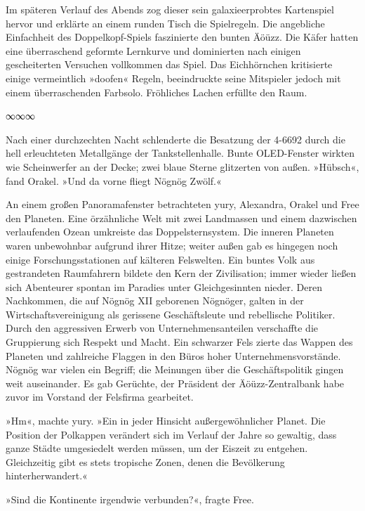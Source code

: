 Im späteren Verlauf des Abends zog dieser sein galaxieerprobtes Kartenspiel hervor und erklärte an einem runden Tisch die Spielregeln. Die angebliche Einfachheit des Doppelkopf-Spiels faszinierte den bunten Äöüzz. Die Käfer hatten eine überraschend geformte Lernkurve und dominierten nach einigen gescheiterten Versuchen vollkommen das Spiel. Das Eichhörnchen kritisierte einige vermeintlich »doofen« Regeln, beeindruckte seine Mitspieler jedoch mit einem überraschenden Farbsolo. Fröhliches Lachen erfüllte den Raum.

\begin{center}
∞∞∞
\end{center}

Nach einer durchzechten Nacht schlenderte die Besatzung der 4-6692 durch die hell erleuchteten Metallgänge der Tankstellenhalle. Bunte OLED-Fenster wirkten wie Scheinwerfer an der Decke; zwei blaue Sterne glitzerten von außen. »Hübsch«, fand Orakel. »Und da vorne fliegt Nögnög Zwölf.«

An einem großen Panoramafenster betrachteten yury, Alexandra, Orakel und Free den Planeten. Eine örzähnliche Welt mit zwei Landmassen und einem dazwischen verlaufenden Ozean umkreiste das Doppelsternsystem. Die inneren Planeten waren unbewohnbar aufgrund ihrer Hitze; weiter außen gab es hingegen noch einige Forschungsstationen auf kälteren Felswelten. Ein buntes Volk aus gestrandeten Raumfahrern bildete den Kern der Zivilisation; immer wieder ließen sich Abenteurer spontan im Paradies unter Gleichgesinnten nieder. Deren Nachkommen, die auf Nögnög XII geborenen Nögnöger, galten in der Wirtschaftsvereinigung als gerissene Geschäftsleute und rebellische Politiker. Durch den aggressiven Erwerb von Unternehmensanteilen verschaffte die Gruppierung sich Respekt und Macht. Ein schwarzer Fels zierte das Wappen des Planeten und zahlreiche Flaggen in den Büros hoher Unternehmensvorstände. Nögnög war vielen ein Begriff; die Meinungen über die Geschäftspolitik gingen weit auseinander. Es gab Gerüchte, der Präsident der Äöüzz-Zentralbank habe zuvor im Vorstand der Felsfirma gearbeitet.

»Hm«, machte yury. »Ein in jeder Hinsicht außergewöhnlicher Planet. Die Position der Polkappen verändert sich im Verlauf der Jahre so gewaltig, dass ganze Städte umgesiedelt werden müssen, um der Eiszeit zu entgehen. Gleichzeitig gibt es stets tropische Zonen, denen die Bevölkerung hinterherwandert.«

»Sind die Kontinente irgendwie verbunden?«, fragte Free.

